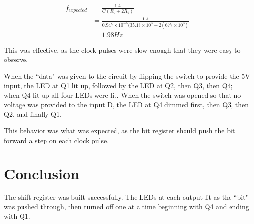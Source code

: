 \documentclass[twocolumn, amsmath]{revtex4}
\begin{document}
\begin{equation*}
\begin{aligned}
f_{expected} &= \frac{1.4}{C(R_a + 2R_b)}\\ &= \frac{1.4}{0.947\times 10^{-6}(35.18\times 10^3 + 2(677\times 10^3)}\\ &= 1.98 Hz
\end{aligned}
\end{equation*}

This was effective, as the clock pulses were slow enough that they were easy to observe.

When the ``data" was given to the circuit by flipping the switch to provide the 5V input, the LED at Q1 lit up, followed by the LED at Q2, then Q3, then Q4; when Q4 lit up all four LEDs were lit. When the switch was opened so that no voltage was provided to the input D, the LED at Q4 dimmed first, then Q3, then Q2, and finally Q1. 

This behavior was what was expected, as the bit register should push the bit forward a step on each clock pulse.



\section{Conclusion}

The shift register was built successfully. The LEDs at each output lit as the ``bit" was pushed through, then turned off one at a time beginning with Q4 and ending with Q1.
\end{document}
